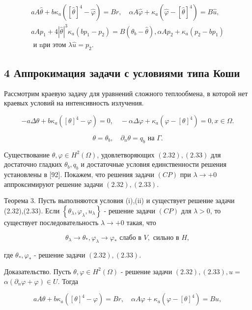 \documentclass[10pt]{article}
\begin{document}
$$
\begin{gathered}
a A \hat{\theta}+b \kappa_{a}\left([\hat{\theta}]^{4}-\hat{\varphi}\right)=B r, \quad \alpha A \hat{\varphi}+\kappa_{a}\left(\hat{\varphi}-[\hat{\theta}]^{4}\right)=B \hat{u}, \\
a A p_{1}+4|\hat{\theta}|^{3} \kappa_{a}\left(b p_{1}-p_{2}\right)=B\left(\theta_{b}-\hat{\theta}\right), \alpha A p_{2}+\kappa_{a}\left(p_{2}-b p_{1}\right) \\
\text { и nри этом } \lambda \hat{u}=p_{2} .
\end{gathered}
$$

\subsection{4 Аппрокимация задачи с условиями типа Коши}
Рассмотрим краевую задачу для уравнений сложного теплообмена, в которой нет краевых условий на интенсивность излучения.

$$
-a \Delta \theta+b \kappa_{a}\left([\theta]^{4}-\varphi\right)=0, \quad-\alpha \Delta \varphi+\kappa_{a}\left(\varphi-[\theta]^{4}\right)=0, x \in \Omega .
$$

$$
\theta=\theta_{b}, \quad \partial_{n} \theta=q_{b} \text { на } \Gamma .
$$

Существование $\theta, \varphi \in H^{2}(\Omega)$, удовлетворяющих $(2.32),(2.33)$ для достаточно гладких $\theta_{b}, q_{b}$ и достаточные условия единственности решения установлены в [92]. Покажем, что решения задачи $(C P)$ при $\lambda \rightarrow+0$ аппроксимируют решение задачи $(2.32),(2.33)$.

Теорема 3. Пусть выполняются условия (i),(ii) и существует решение задачи (2.32),(2.33). Если $\left\{\theta_{\lambda}, \varphi_{\lambda}, u_{\lambda}\right\}$ - решение задачи $(C P)$ для $\lambda>0$, то существует последовательность $\lambda \rightarrow+0$ такая, что

$$
\theta_{\lambda} \rightarrow \theta_{*}, \varphi_{\lambda} \rightarrow \varphi_{*} \text { слабо в } V, \text { сильно в } H,
$$

где $\theta_{*}, \varphi_{*}$ - решение задачи $(2.32),(2.33)$.

Доказательство. Пусть $\theta, \varphi \in H^{2}(\Omega)$ - решение задачи $(2.32),(2.33), u=$ $\alpha\left(\partial_{n} \varphi+\varphi\right) \in U$. Тогда

$$
a A \theta+b \kappa_{a}\left([\theta]^{4}-\varphi\right)=B r, \quad \alpha A \varphi+\kappa_{a}\left(\varphi-[\theta]^{4}\right)=B u,
$$
\end{document}
